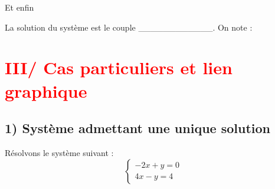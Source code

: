 \documentclass[12pt]{article}
\begin{document}
\vspace{0.5cm}
{\color{black!45}\dotfill}

\vspace{0.5cm}
{\color{black!45}\dotfill}

\vspace{20pt}
Et enfin {\color{black!45}\dotfill}

\vspace{0.5cm}
{\color{black!45}\dotfill}

\vspace{0.5cm}
{\color{black!45}\dotfill}

\vspace{20pt}

La solution du système est le couple \_\_\_\_\_\_\_\_\_\_\_\_. On note : 

\vspace{20pt}
\vspace{10pt}
\section*{\textcolor{red}{III/ Cas particuliers et lien graphique}}

\subsection*{1) Système admettant une unique solution}
\vspace{5pt}

Résolvons le système suivant : 
$$
\left\{
    \begin{array}{ll}
        -2x + y = 0 \\
        4x - y = 4
    \end{array}
\right.
$$

\vspace{0.5cm}
{\color{black!45}\dotfill}

\vspace{0.5cm}
{\color{black!45}\dotfill}

\vspace{0.5cm}
{\color{black!45}\dotfill}

\vspace{0.5cm}
{\color{black!45}\dotfill}

\vspace{0.5cm}
{\color{black!45}\dotfill}

\vspace{0.5cm}
{\color{black!45}\dotfill}

\vspace{20pt}
\end{document}
